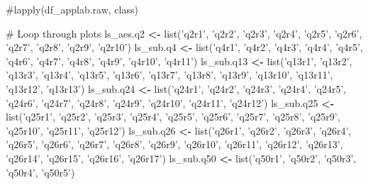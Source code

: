 \documentclass[]{article}
\newenvironment{Shaded}{\begin{snugshade}}{\end{snugshade}}
\newcommand{\KeywordTok}[1]{\textcolor[rgb]{0.13,0.29,0.53}{\textbf{{#1}}}}
\newcommand{\StringTok}[1]{\textcolor[rgb]{0.31,0.60,0.02}{{#1}}}
\newcommand{\OtherTok}[1]{\textcolor[rgb]{0.56,0.35,0.01}{{#1}}}
\newcommand{\NormalTok}[1]{{#1}}
\begin{document}
\begin{Shaded}
\begin{Highlighting}[]
{\OtherTok{#lapply(df_applab.raw, class)}


\OtherTok{# Loop through plots}
\NormalTok{ls_aes.q2 }\KeywordTok{<-} \NormalTok{list(}\StringTok{'q2r1'}\NormalTok{, }\StringTok{'q2r2'}\NormalTok{, }\StringTok{'q2r3'}\NormalTok{, }\StringTok{'q2r4'}\NormalTok{, }\StringTok{'q2r5'}\NormalTok{, }
                  \StringTok{'q2r6'}\NormalTok{, }\StringTok{'q2r7'}\NormalTok{, }\StringTok{'q2r8'}\NormalTok{, }\StringTok{'q2r9'}\NormalTok{, }\StringTok{'q2r10'}\NormalTok{)}
\NormalTok{ls_sub.q4 }\KeywordTok{<-} \NormalTok{list(}\StringTok{'q4r1'}\NormalTok{, }\StringTok{'q4r2'}\NormalTok{, }\StringTok{'q4r3'}\NormalTok{, }\StringTok{'q4r4'}\NormalTok{, }\StringTok{'q4r5'}\NormalTok{, }
                  \StringTok{'q4r6'}\NormalTok{, }\StringTok{'q4r7'}\NormalTok{, }\StringTok{'q4r8'}\NormalTok{, }\StringTok{'q4r9'}\NormalTok{, }\StringTok{'q4r10'}\NormalTok{, }\StringTok{'q4r11'}\NormalTok{)}
\NormalTok{ls_sub.q13 }\KeywordTok{<-} \NormalTok{list(}\StringTok{'q13r1'}\NormalTok{, }\StringTok{'q13r2'}\NormalTok{, }\StringTok{'q13r3'}\NormalTok{, }\StringTok{'q13r4'}\NormalTok{, }\StringTok{'q13r5'}\NormalTok{, }\StringTok{'q13r6'}\NormalTok{, }
                   \StringTok{'q13r7'}\NormalTok{, }\StringTok{'q13r8'}\NormalTok{, }\StringTok{'q13r9'}\NormalTok{, }\StringTok{'q13r10'}\NormalTok{, }\StringTok{'q13r11'}\NormalTok{, }\StringTok{'q13r12'}\NormalTok{, }\StringTok{'q13r13'}\NormalTok{)}
\NormalTok{ls_sub.q24 }\KeywordTok{<-} \NormalTok{list(}\StringTok{'q24r1'}\NormalTok{, }\StringTok{'q24r2'}\NormalTok{, }\StringTok{'q24r3'}\NormalTok{, }\StringTok{'q24r4'}\NormalTok{, }\StringTok{'q24r5'}\NormalTok{, }\StringTok{'q24r6'}\NormalTok{, }
                   \StringTok{'q24r7'}\NormalTok{, }\StringTok{'q24r8'}\NormalTok{, }\StringTok{'q24r9'}\NormalTok{, }\StringTok{'q24r10'}\NormalTok{, }\StringTok{'q24r11'}\NormalTok{, }\StringTok{'q24r12'}\NormalTok{)}
\NormalTok{ls_sub.q25 }\KeywordTok{<-} \NormalTok{list(}\StringTok{'q25r1'}\NormalTok{, }\StringTok{'q25r2'}\NormalTok{, }\StringTok{'q25r3'}\NormalTok{, }\StringTok{'q25r4'}\NormalTok{, }\StringTok{'q25r5'}\NormalTok{, }\StringTok{'q25r6'}\NormalTok{, }
                   \StringTok{'q25r7'}\NormalTok{, }\StringTok{'q25r8'}\NormalTok{, }\StringTok{'q25r9'}\NormalTok{, }\StringTok{'q25r10'}\NormalTok{, }\StringTok{'q25r11'}\NormalTok{, }\StringTok{'q25r12'}\NormalTok{)}
\NormalTok{ls_sub.q26 }\KeywordTok{<-} \NormalTok{list(}\StringTok{'q26r1'}\NormalTok{, }\StringTok{'q26r2'}\NormalTok{, }\StringTok{'q26r3'}\NormalTok{, }\StringTok{'q26r4'}\NormalTok{, }\StringTok{'q26r5'}\NormalTok{, }\StringTok{'q26r6'}\NormalTok{, }\StringTok{'q26r7'}\NormalTok{, }\StringTok{'q26r8'}\NormalTok{, }
                   \StringTok{'q26r9'}\NormalTok{, }\StringTok{'q26r10'}\NormalTok{, }\StringTok{'q26r11'}\NormalTok{, }\StringTok{'q26r12'}\NormalTok{, }\StringTok{'q26r13'}\NormalTok{, }\StringTok{'q26r14'}\NormalTok{, }\StringTok{'q26r15'}\NormalTok{, }\StringTok{'q26r16'}\NormalTok{, }\StringTok{'q26r17'}\NormalTok{)}
\NormalTok{ls_sub.q50 }\KeywordTok{<-} \NormalTok{list(}\StringTok{'q50r1'}\NormalTok{, }\StringTok{'q50r2'}\NormalTok{, }\StringTok{'q50r3'}\NormalTok{, }\StringTok{'q50r4'}\NormalTok{, }\StringTok{'q50r5'}\NormalTok{)}

}
\end{Highlighting}
\end{Shaded}
\end{document}
